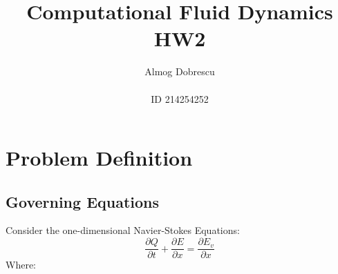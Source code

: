 \documentclass[11pt, a4paper]{article}
\title{Computational Fluid Dynamics \\ HW2}
\author{Almog Dobrescu\\\\ID 214254252}
\begin{document}
\maketitle
\thispagestyle{empty}
\newpage

\thispagestyle{empty}
\tableofcontents
\vfil
\listoffigures
\newpage

\thispagestyle{empty}
\printnomenclature
\newpage

\setcounter{page}{1}
\section{Problem Definition}
\subsection{Governing Equations}
Consider the one-dimensional Navier-Stokes Equations:
\begin{equation}
    \frac{\partial Q}{\partial t}+\frac{\partial E}{\partial x}=\frac{\partial E_v}{\partial x}
\end{equation}
Where:
\end{document}
